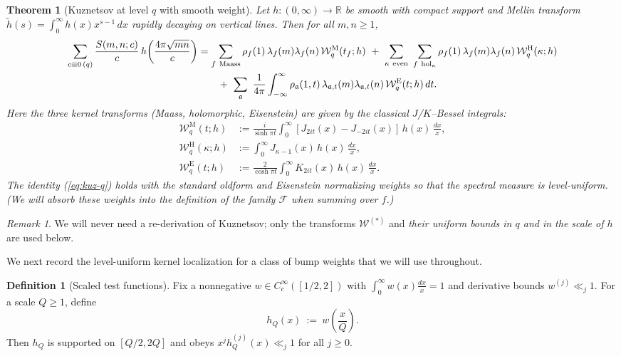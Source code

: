 \documentclass[11pt]{article}
\def\eqref#1{(\ref{#1})}%
\newtheorem{theorem}[lemma]{Theorem}
\theoremstyle{definition}
\newtheorem{definition}[lemma]{Definition}
\theoremstyle{remark}
\newtheorem{remark}[lemma]{Remark}
\numberwithin{equation}{part}
\begin{document}
\begin{theorem}[Kuznetsov at level $q$ with smooth weight]\label{thm:kuz-levelq}
	Let $h:(0,\infty)\to\mathbb R$ be smooth with compact support and Mellin transform $\widetilde h(s)=\int_0^\infty h(x)x^{s-1}\,dx$ rapidly decaying on vertical lines. Then for all $m,n\ge1$,
	\begin{align}
		\sum_{c\equiv 0\,(q)} \frac{S(m,n;c)}{c}\,h\!\left(\frac{4\pi\sqrt{mn}}{c}\right)
		 & = \sum_{f\ \mathrm{Maass}} \rho_f(1)\,\lambda_f(m)\lambda_f(n)\,\mathcal W_q^{\mathrm{M}}(t_f;h)
		\ +\ \sum_{\kappa\ \mathrm{even}}\ \sum_{f\ \mathrm{hol}_\kappa} \rho_f(1)\,\lambda_f(m)\lambda_f(n)\,\mathcal W_q^{\mathrm{H}}(\kappa;h) \notag                                         \\
		 & \qquad+\ \sum_{\mathfrak a}\ \frac{1}{4\pi}\int_{-\infty}^{\infty} \rho_{\mathfrak a}(1,t)\,\lambda_{\mathfrak a,t}(m)\lambda_{\mathfrak a,t}(n)\,\mathcal W_q^{\mathrm{E}}(t;h)\,dt.
		\label{eq:kuz-q}
	\end{align}
	Here the three kernel transforms (Maass, holomorphic, Eisenstein) are given by the classical $J$/$K$–Bessel integrals:
	\begin{align*}
		\mathcal W_q^{\mathrm{M}}(t;h)
		 & := \frac{i}{\sinh \pi t}\int_0^\infty \left[J_{2it}(x)-J_{-2it}(x)\right]\,h(x)\,\frac{dx}{x}, \\
		\mathcal W_q^{\mathrm{H}}(\kappa;h)
		 & := \int_0^\infty J_{\kappa-1}(x)\,h(x)\,\frac{dx}{x},                                          \\
		\mathcal W_q^{\mathrm{E}}(t;h)
		 & := \frac{2}{\cosh \pi t}\int_0^\infty K_{2it}(x)\,h(x)\,\frac{dx}{x}.
	\end{align*}
	The identity \eqref{eq:kuz-q} holds with the standard oldform and Eisenstein normalizing weights so that the spectral measure is level-uniform. (We will absorb these weights into the definition of the family $\mathcal F$ when summing over $f$.)
\end{theorem}

\begin{remark}
	We will never need a re-derivation of Kuznetsov; only the transforms $\mathcal W^{(*)}$ and \emph{their uniform bounds in $q$ and in the scale of $h$} are used below.
\end{remark}

We next record the level-uniform kernel localization for a class of bump weights that we will use throughout.

\begin{definition}[Scaled test functions]\label{def:scaled-hQ}
	Fix a nonnegative $w\in C_c^\infty([1/2,2])$ with $\int_0^\infty w(x)\frac{dx}{x}=1$ and derivative bounds $w^{(j)}\ll_j 1$. For a scale $Q\ge1$, define
	\[
		h_Q(x)\ :=\ w\!\left(\frac{x}{Q}\right).
	\]
	Then $h_Q$ is supported on $[Q/2,2Q]$ and obeys $x^j h_Q^{(j)}(x)\ll_j 1$ for all $j\ge0$.
\end{definition}
\end{document}
